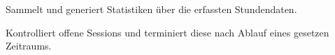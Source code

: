 \begin{itemize}
\begin{itemize}
                        Sammelt und generiert Statistiken über die erfassten Stundendaten.
                        \begin{itemize}
                        \end{itemize}

                        Kontrolliert offene Sessions und terminiert diese nach Ablauf eines gesetzen Zeitraums.
                        \begin{itemize}
                        \end{itemize}
                \end{itemize}

            \begin{itemize}
                 \itm{}
            \end{itemize}

        \end{itemize}

